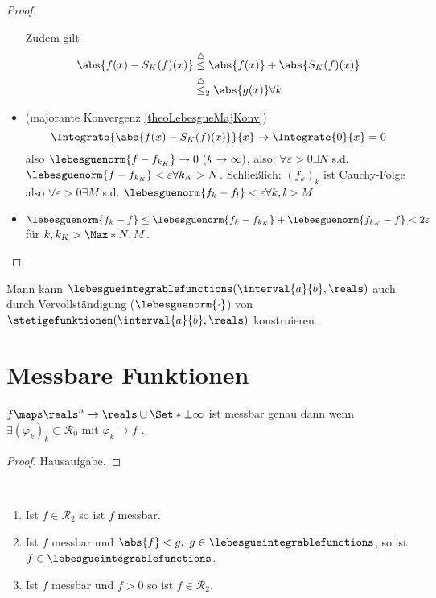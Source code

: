 \begin{proof}
\begin{itemize}
        Zudem gilt 
        \begin{align*}
            \abs{f(x)-S_K(f)(x)}&\overset{\triangle}{\le}\abs{f(x)}+\abs{S_K(f)(x)}\\
            &\overset{\triangle}{\leq}_2\abs{g(x)} \forall k
        \end{align*}
        \item (majorante Konvergenz \ref{theoLebesgueMajKonv})
        \begin{equation*}
            \Integrate{\abs{f(x)-S_K(f)(x)}}{x}\to\Integrate{ 0}{x}=0
        \end{equation*}
        also \(\lebesguenorm{f-f_{k_K}}\to 0\ (k\to\infty)\), also: \(\forall\varepsilon>0\exists N\) s.d. \(\lebesguenorm{f-f_{k_K}}<\varepsilon\forall k_K> N\).
        Schließlich: \((f_k)_k\) ist Cauchy-Folge also \(\forall\varepsilon>0\exists M\) s.d. \(\lebesguenorm{f_k-f_l}<\varepsilon\forall k,l> M\)
        \item \(\lebesguenorm{f_k-f}\le\lebesguenorm{f_k-f_{k_K}}+\lebesguenorm{f_{k_K}-f}<2\varepsilon\) für \(k,k_K>\Max*{N,M}\).
    \end{itemize}
\end{proof}

Mann kann \(\lebesgueintegrablefunctions(\interval{a}{b},\reals)\) auch durch Vervollständigung (\bzgl \(\lebesguenorm{\cdot}\)) von \(\stetigefunktionen(\interval{a}{b},\reals)\) konstruieren.


\section*{Messbare Funktionen}

\begin{lemma}
    \label{lemmMessbareFkt} %
    \(f\maps\reals^n\to\reals\cup\Set*{\pm\infty}\) ist messbar genau dann wenn \(\exists (\varphi_k)_k\subset \mathcal{R_0}\) mit \(\varphi_k\to f\) \fue.
\end{lemma}

\begin{proof}
    Hausaufgabe.
\end{proof}

\begin{lemma}\ 
    \label{lemmMessbareFkt2}

    \begin{enumerate}
        \item Ist \(f\in\mathcal{R}_2\) so ist \(f\) messbar.
        \item Ist \(f\) messbar und \(\abs{f}<g,\ g\in \lebesgueintegrablefunctions\), so ist \(f\in \lebesgueintegrablefunctions\).
        \item Ist \(f\) messbar und \(f> 0\) so ist \(f\in\mathcal{R_2}\).
    \end{enumerate}
\end{lemma}

